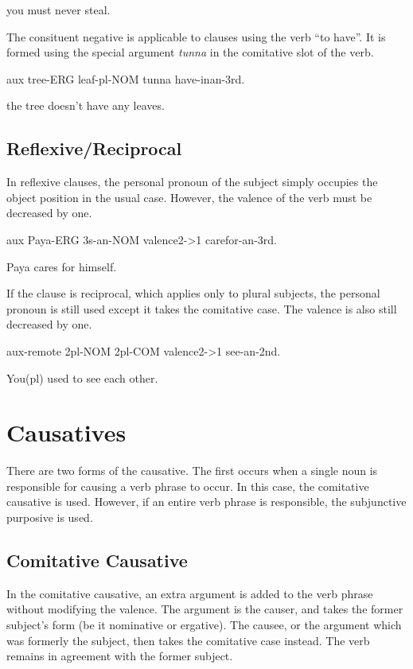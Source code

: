 you must never steal.

The consituent negative is applicable to clauses using the verb ``to have''. It is
formed using the special argument \textit{tunna} in the comitative slot of the verb.

aux tree-ERG leaf-pl-NOM tunna have-inan-3rd.

the tree doesn't have any leaves.

\subsection{Reflexive/Reciprocal}

In reflexive clauses, the personal pronoun of the subject simply occupies the
object position in the usual case. However, the valence of the verb must be
decreased by one.

aux Paya-ERG 3s-an-NOM valence2->1 carefor-an-3rd.

Paya cares for himself.

If the clause is reciprocal, which applies only to plural subjects, the personal
pronoun is still used except it takes the comitative case. The valence is also
still decreased by one.

aux-remote 2pl-NOM 2pl-COM valence2->1 see-an-2nd.

You(pl) used to see each other.

\section{Causatives}

There are two forms of the causative. The first occurs when a single noun is
responsible for causing a verb phrase to occur. In this case, the comitative
causative is used. However, if an entire verb phrase is responsible, the
subjunctive purposive is used.

\subsection{Comitative Causative}

In the comitative causative, an extra argument is added to the verb phrase
without modifying the valence. The argument is the causer, and takes the former
subject's form (be it nominative or ergative). The causee, or the argument which
was formerly the subject, then takes the comitative case instead. The verb
remains in agreement with the former subject.


